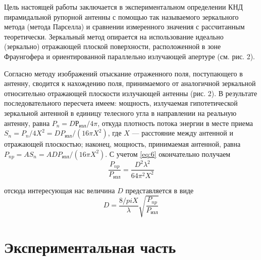 Цель настоящей работы заключается в экспериментальном определении КНД пирамидальной рупорной антенны с помощью так 
называемого зеркального метода (метода Парселла) и сравнении измеренного значения с рассчитанным теоретически. 
Зеркальный метод опирается на использование идеально (зеркально) отражающей плоской поверхности, расположенной в зоне 
Фраунгофера и ориентированной параллельно излучающей апертуре (см. рис. 2).


Согласно методу изображений отыскание отраженного поля, поступающего в антенну, сводится к нахождению поля, 
принимаемого от аналогичной зеркальной относительно отражающей плоскости излучающей антенны (рис. 2). В результате 
последовательного пересчета имеем: мощность, излучаемая гипотетической зеркальной антенной в единицу телесного угла 
в направлении на реальную антенну, равна $P_n = D Р_{\text{изл}}/4\pi$, откуда плотность потока энергии в месте приема 
$S_n = P_n/4X^2 = D P_{\text{изл}}/(16\pi X^2)$, где $X$ — расстояние между антенной и отражающей плоскостью; наконец, 
мощность, принимаемая антенной, равна $P_{np} =A S_n =A D P_{\text{изл}}/(16\pi X^2)$. С учетом \ref{eq:6} окончательно 
получаем
\begin{equation}
    \frac{P_{np}}{P_{\text{изл}}} = \frac{D^2\lambda^2}{64\pi^2X^2}
    \label{eq:7}
\end{equation}

отсюда интересующая нас величина $D$ представляется в виде 
\begin{equation}
    D = \frac{8/pi X}{\lambda}\sqrt{\frac{P_{np}}{P_{\text{изл}}}}
    \label{eq:8}
\end{equation}



\newpage
\section{Экспериментальная часть}



